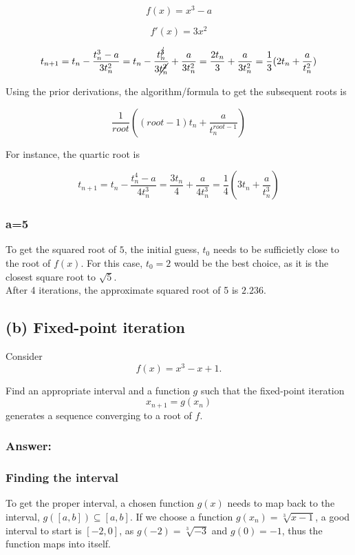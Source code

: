\documentclass[11pt]{article}
\begin{document}
$$f(x) = x^3 - a$$

$$f'(x) = 3x^2 $$

\[ t_{n+1} = t_n - \frac{t_n^3-a}{3t_n^2} = t_n - \frac{t_n^{\cancel{3}}}{3\cancel{t_n^2}} + \frac{a}{3t_n^2}
 = \frac{2t_n}{3} + \frac{a}{3t_n^2} = \frac{1}{3}(2t_n + \frac{a}{t_n^2})\]

\noindent Using the prior derivations, the algorithm/formula to get the subsequent roots is

$$\frac{1}{root}((root-1)t_n + \frac{a}{t_n^{root-1}})$$

\noindent For instance, the quartic root is

\[ t_{n+1} = t_n - \frac{t_n^4-a}{4t_n^3} = \frac{3t_n}{4} + \frac{a}{4t_n^3} = \frac{1}{4}(3t_n + \frac{a}{t_n^3}) \]

\subsubsection*{a=5}

\noindent To get the squared root of $5$, the initial guess, $t_0$ needs to be sufficietly close
to the root of $f(x)$. For this case, $t_0=2$ would be the best choice, as it is the closest
square root to $\sqrt{5}$.\\

\noindent After 4 iterations, the approximate squared root of 5 is $2.236$.

\subsection*{(b) Fixed-point iteration}

Consider
\[
f(x)=x^3-x+1.
\]

\noindent Find an appropriate interval and a function \(g\) such that the fixed-point iteration
\[
x_{n+1}=g(x_n)
\]
generates a sequence converging to a root of \(f\).

\subsubsection*{Answer:}

\subsubsection*{Finding the interval}
To get the proper interval, a chosen function $g(x)$ needs to map back to the interval, $g([a,b])\subseteq [a,b]$.
If we choose a function $g(x_n)=\sqrt[3]{x-1}$, a good interval to start is $[-2, 0]$, as $g(-2)=\sqrt[3]{-3}$ and $g(0)=-1$, 
thus the function maps into itself.
\end{document}
